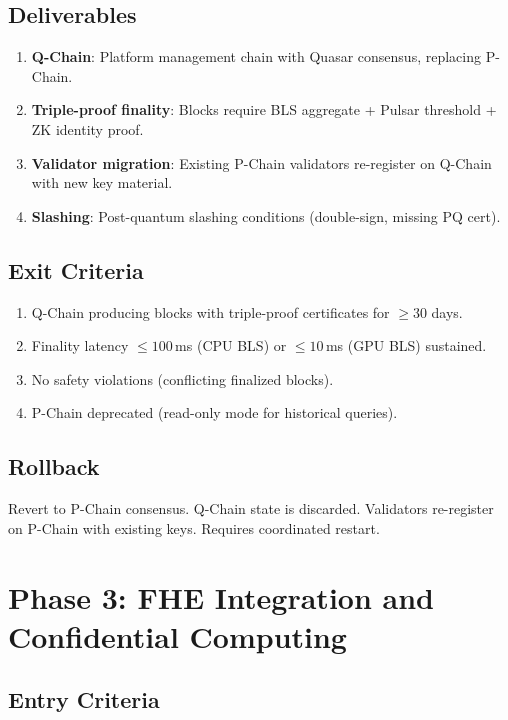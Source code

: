 \documentclass[11pt]{article}
\begin{document}
\subsection{Deliverables}

\begin{enumerate}
\item \textbf{Q-Chain}: Platform management chain with Quasar consensus, replacing P-Chain.
\item \textbf{Triple-proof finality}: Blocks require BLS aggregate + Pulsar threshold + ZK identity proof.
\item \textbf{Validator migration}: Existing P-Chain validators re-register on Q-Chain with new key material.
\item \textbf{Slashing}: Post-quantum slashing conditions (double-sign, missing PQ cert).
\end{enumerate}

\subsection{Exit Criteria}

\begin{enumerate}
\item Q-Chain producing blocks with triple-proof certificates for $\geq 30$ days.
\item Finality latency $\leq 100$\,ms (CPU BLS) or $\leq 10$\,ms (GPU BLS) sustained.
\item No safety violations (conflicting finalized blocks).
\item P-Chain deprecated (read-only mode for historical queries).
\end{enumerate}

\subsection{Rollback}

Revert to P-Chain consensus. Q-Chain state is discarded. Validators re-register on P-Chain with existing keys. Requires coordinated restart.

\section{Phase 3: FHE Integration and Confidential Computing}

\subsection{Entry Criteria}
\end{document}
